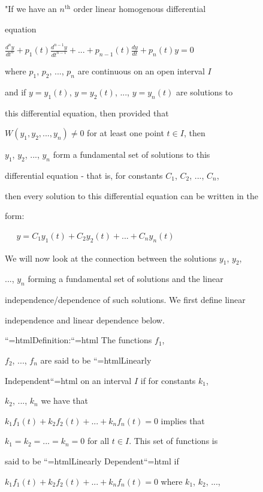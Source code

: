 "If we have an $n^{\mathrm{th}}$ order linear homogenous differential

equation

$\frac{d^ny}{dt^n} + p_1(t) \frac{d^{n-1}y}{dt^{n-1}} + ... + p_{n-1}(t) \frac{dy}{dt} + p_n(t)y = 0$

where $p_1$, $p_2$, ..., $p_n$ are continuous on an open interval $I$

and if $y = y_1(t)$, $y = y_2(t)$, ..., $y = y_n(t)$ are solutions to

this differential equation, then provided that

$W(y_1, y_2, ..., y_n) \neq 0$ for at least one point $t \in I$, then

$y_1$, $y_2$, ..., $y_n$ form a fundamental set of solutions to this

differential equation - that is, for constants $C_1$, $C_2$, ..., $C_n$,

then every solution to this differential equation can be written in the

form:



$\begin{aligned} \quad y = C_1y_1(t) + C_2y_2(t) + ... + C_ny_n(t) \end{aligned}$



We will now look at the connection between the solutions $y_1$, $y_2$,

..., $y_n$ forming a fundamental set of solutions and the linear

independence/dependence of such solutions. We first define linear

independence and linear dependence below.







``{=html}Definition:``{=html} The functions $f_1$,

$f_2$, ..., $f_n$ are said to be ``{=html}Linearly

Independent``{=html} on an interval $I$ if for constants $k_1$,

$k_2$, ..., $k_n$ we have that

$k_1f_1(t) + k_2f_2(t) + ... + k_nf_n(t) = 0$ implies that

$k_1 = k_2 = ... = k_n = 0$ for all $t \in I$. This set of functions is

said to be ``{=html}Linearly Dependent``{=html} if

$k_1f_1(t) + k_2f_2(t) + ... + k_nf_n(t) = 0$ where $k_1$, $k_2$, ...,

